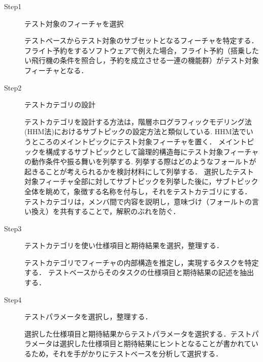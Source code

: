 \begin{description}
\item[Step1] テスト対象のフィーチャを選択

テストベースからテスト対象のサブセットとなるフィーチャを特定する．フライト予約をするソフトウェアで例えた場合，フライト予約（搭乗したい飛行機の条件を照合し，予約を成立させる一連の機能群）がテスト対象フィーチャとなる．

\item[Step2] テストカテゴリの設計

テストカテゴリを設計する方法は，階層ホログラフィックモデリング法(HHM法)におけるサブトピックの設定方法と類似している\cite{HHM2002}.
HHM法でいうところのメイントピックにテスト対象フィーチャを置く．
メイントピックを構成するサブトピックとして論理的構造毎にテスト対象フィーチャの動作条件や振る舞いを列挙する.
列挙する際はどのようなフォールトが起きることが考えられるかを検討材料にして列挙する．
選択したテスト対象フィーチャ全部に対してサブトピックを列挙した後に，サブトピック全体を眺めて，象徴する名称を付与し，それをテストカテゴリにする．
テストカテゴリは，メンバ間で内容を説明し，意味づけ（フォールトの言い換え）を共有することで，解釈のぶれを防ぐ．


\item[Step3] テストカテゴリを使い仕様項目と期待結果を選択，整理する．

テストカテゴリでフィーチャの内部構造を推定し，実現するタスクを特定する．
テストベースからそのタスクの仕様項目と期待結果の記述を抽出する．


\item[Step4] テストパラメータを選択し，整理する．

選択した仕様項目と期待結果からテストパラメータを選択する．テストパラメータは選択した仕様項目と期待結果にヒントとなることが書かれているため，それを手がかりにテストベースを分析して選択する．

\end{description}



